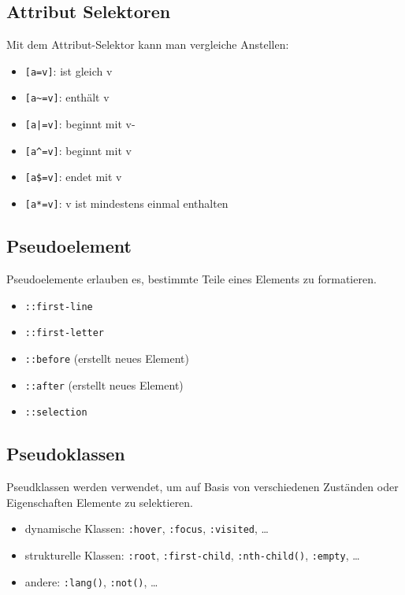 \documentclass[11pt,twoside,landscape]{article}
\begin{document}
\begin{multicols}{4}
\subsection*{Attribut Selektoren}
\label{sec:org732c309}
Mit dem Attribut-Selektor kann man vergleiche Anstellen:
\begin{itemize}
\item \texttt{[a=v]}: ist gleich v
\item \texttt{[a\textasciitilde{}=v]}: enthält v
\item \texttt{[a|=v]}: beginnt mit v-
\item \texttt{[a\textasciicircum{}=v]}: beginnt mit v
\item \texttt{[a\$=v]}: endet mit v
\item \texttt{[a*=v]}: v ist mindestens einmal enthalten
\end{itemize}


\subsection*{Pseudoelement}
\label{sec:orga136a16}
Pseudoelemente erlauben es, bestimmte Teile eines Elements zu formatieren.
\begin{itemize}
\item \texttt{::first-line}
\item \texttt{::first-letter}
\item \texttt{::before} (erstellt neues Element)
\item \texttt{::after} (erstellt neues Element)
\item \texttt{::selection}
\end{itemize}


\subsection*{Pseudoklassen}
\label{sec:orge8eb865}
Pseudklassen werden verwendet, um auf Basis von verschiedenen Zuständen oder Eigenschaften Elemente zu selektieren.
\begin{itemize}
\item dynamische Klassen: \texttt{:hover}, \texttt{:focus}, \texttt{:visited}, \ldots{}
\item strukturelle Klassen: \texttt{:root}, \texttt{:first-child}, \texttt{:nth-child()}, \texttt{:empty}, \ldots{}
\item andere: \texttt{:lang()}, \texttt{:not()}, \ldots{}
\end{itemize}



\end{multicols}
\end{document}
